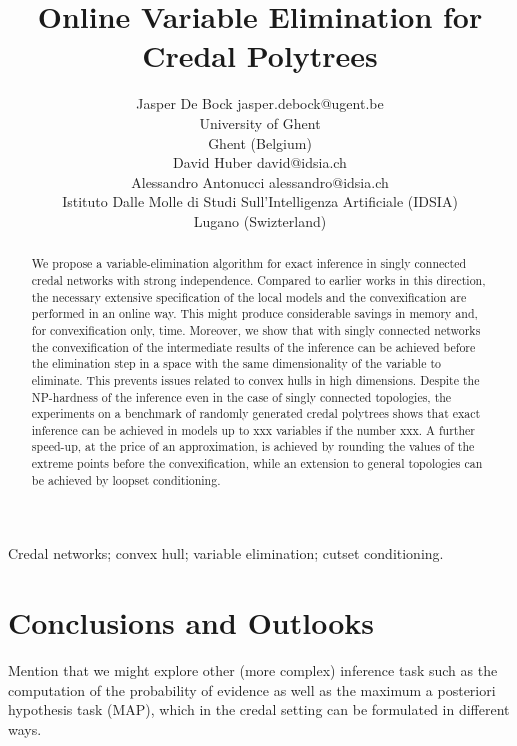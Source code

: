 \documentclass[twoside,11pt]{article}
\begin{document}
\title{Online Variable Elimination for Credal Polytrees}
\author{\name Jasper De Bock \email jasper.debock@ugent.be\\
\addr University of Ghent\\
Ghent (Belgium)\\
\AND
\name David Huber \email david@idsia.ch\\
\name Alessandro Antonucci \email alessandro@idsia.ch\\
\addr Istituto Dalle Molle di Studi Sull'Intelligenza Artificiale (IDSIA)\\
Lugano (Swizterland)}
\maketitle
\begin{abstract}%
We propose a variable-elimination algorithm for exact inference in singly connected credal networks with strong independence. Compared to earlier works in this direction, the necessary extensive specification of the local models and the convexification are performed in an online way. This might produce considerable savings in memory and, for convexification only, time. Moreover, we show that with singly connected networks the convexification of the intermediate results of the inference can be achieved before the elimination step in a space with the same dimensionality of the variable to eliminate. This prevents issues related to convex hulls in high dimensions. Despite the NP-hardness of the inference even in the case of singly connected topologies, the experiments on a benchmark of randomly generated credal polytrees shows that exact inference can be achieved in models up to xxx variables if the number xxx. A further speed-up, at the price of an approximation, is achieved by rounding the values of the extreme points before the convexification, while an extension to general topologies can be achieved by loopset conditioning.
\end{abstract}
\begin{keywords}
Credal networks; convex hull; variable elimination; cutset conditioning.
\end{keywords}





%
\section{Conclusions and Outlooks}
Mention that we might explore other (more complex) inference task such as the computation of the probability of evidence as well as the maximum a posteriori hypothesis task (MAP), which in the credal setting can be formulated in different ways.

\end{document}

